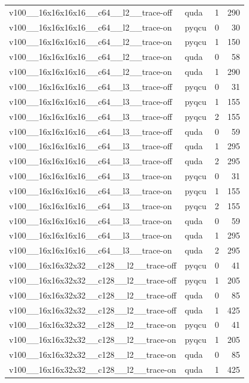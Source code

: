 \begin{table}[htbp]
\begin{tabular}{@{}llrr@{}}
v100\_\_16x16x16x16\_\_c64\_\_l2\_\_trace-off & quda & 1 & 290 \\
v100\_\_16x16x16x16\_\_c64\_\_l2\_\_trace-on & pyqcu & 0 & 30 \\
v100\_\_16x16x16x16\_\_c64\_\_l2\_\_trace-on & pyqcu & 1 & 150 \\
v100\_\_16x16x16x16\_\_c64\_\_l2\_\_trace-on & quda & 0 & 58 \\
v100\_\_16x16x16x16\_\_c64\_\_l2\_\_trace-on & quda & 1 & 290 \\
v100\_\_16x16x16x16\_\_c64\_\_l3\_\_trace-off & pyqcu & 0 & 31 \\
v100\_\_16x16x16x16\_\_c64\_\_l3\_\_trace-off & pyqcu & 1 & 155 \\
v100\_\_16x16x16x16\_\_c64\_\_l3\_\_trace-off & pyqcu & 2 & 155 \\
v100\_\_16x16x16x16\_\_c64\_\_l3\_\_trace-off & quda & 0 & 59 \\
v100\_\_16x16x16x16\_\_c64\_\_l3\_\_trace-off & quda & 1 & 295 \\
v100\_\_16x16x16x16\_\_c64\_\_l3\_\_trace-off & quda & 2 & 295 \\
v100\_\_16x16x16x16\_\_c64\_\_l3\_\_trace-on & pyqcu & 0 & 31 \\
v100\_\_16x16x16x16\_\_c64\_\_l3\_\_trace-on & pyqcu & 1 & 155 \\
v100\_\_16x16x16x16\_\_c64\_\_l3\_\_trace-on & pyqcu & 2 & 155 \\
v100\_\_16x16x16x16\_\_c64\_\_l3\_\_trace-on & quda & 0 & 59 \\
v100\_\_16x16x16x16\_\_c64\_\_l3\_\_trace-on & quda & 1 & 295 \\
v100\_\_16x16x16x16\_\_c64\_\_l3\_\_trace-on & quda & 2 & 295 \\
v100\_\_16x16x32x32\_\_c128\_\_l2\_\_trace-off & pyqcu & 0 & 41 \\
v100\_\_16x16x32x32\_\_c128\_\_l2\_\_trace-off & pyqcu & 1 & 205 \\
v100\_\_16x16x32x32\_\_c128\_\_l2\_\_trace-off & quda & 0 & 85 \\
v100\_\_16x16x32x32\_\_c128\_\_l2\_\_trace-off & quda & 1 & 425 \\
v100\_\_16x16x32x32\_\_c128\_\_l2\_\_trace-on & pyqcu & 0 & 41 \\
v100\_\_16x16x32x32\_\_c128\_\_l2\_\_trace-on & pyqcu & 1 & 205 \\
v100\_\_16x16x32x32\_\_c128\_\_l2\_\_trace-on & quda & 0 & 85 \\
v100\_\_16x16x32x32\_\_c128\_\_l2\_\_trace-on & quda & 1 & 425 \\

\end{tabular}
\end{table}

